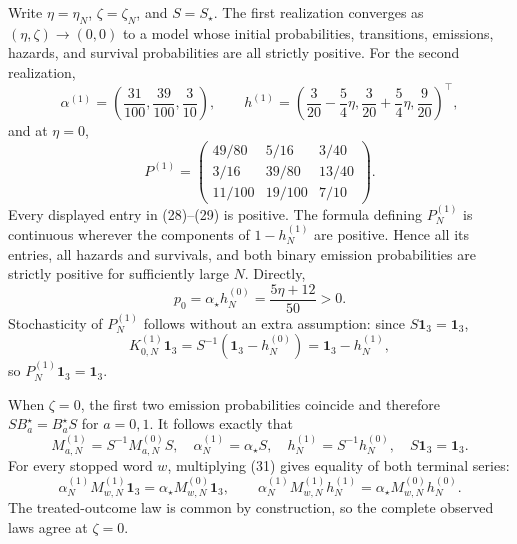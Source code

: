 Write \(\eta=\eta_N\), \(\zeta=\zeta_N\), and \(S=S_{\star}\).  The first realization converges as \((\eta,\zeta)\to(0,0)\) to a model whose initial probabilities, transitions, emissions, hazards, and survival probabilities are all strictly positive.  For the second realization,
\[
 \alpha^{(1)}=\left(\frac{31}{100},\frac{39}{100},\frac3{10}\right),
 \qquad
 h^{(1)}=\left(\frac3{20}-\frac54\eta,\frac3{20}+\frac54\eta,\frac9{20}\right)^{\top}, \tag{28}
\]
and at \(\eta=0\),
\[
 P^{(1)}=
 \begin{pmatrix}
 49/80&5/16&3/40\\
 3/16&39/80&13/40\\
 11/100&19/100&7/10
 \end{pmatrix}.                                                \tag{29}
\]
Every displayed entry in (28)--(29) is positive.  The formula defining \(P_N^{(1)}\) is continuous wherever the components of \(1-h_N^{(1)}\) are positive.  Hence all its entries, all hazards and survivals, and both binary emission probabilities are strictly positive for sufficiently large \(N\).  Directly,
\[
 p_0=\alpha_{\star}h_N^{(0)}=\frac{5\eta+12}{50}>0.            \tag{30}
\]
Stochasticity of \(P_N^{(1)}\) follows without an extra assumption: since \(S\mathbf 1_3=\mathbf 1_3\),
\[
 K_{0,N}^{(1)}\mathbf 1_3
 =S^{-1}(\mathbf 1_3-h_N^{(0)})
 =\mathbf 1_3-h_N^{(1)},
\]
so \(P_N^{(1)}\mathbf 1_3=\mathbf 1_3\).

When \(\zeta=0\), the first two emission probabilities coincide and therefore \(SB_a^{\star}=B_a^{\star}S\) for \(a=0,1\).  It follows exactly that
\[
 M_{a,N}^{(1)}=S^{-1}M_{a,N}^{(0)}S,
 \quad \alpha_N^{(1)}=\alpha_{\star}S,
 \quad h_N^{(1)}=S^{-1}h_N^{(0)},
 \quad S\mathbf 1_3=\mathbf 1_3.                              \tag{31}
\]
For every stopped word \(w\), multiplying (31) gives equality of both terminal series:
\[
 \alpha_N^{(1)}M_{w,N}^{(1)}\mathbf 1_3
 =\alpha_{\star}M_{w,N}^{(0)}\mathbf 1_3,
 \qquad
 \alpha_N^{(1)}M_{w,N}^{(1)}h_N^{(1)}
 =\alpha_{\star}M_{w,N}^{(0)}h_N^{(0)}.                       \tag{32}
\]
The treated-outcome law is common by construction, so the complete observed laws agree at \(\zeta=0\).

